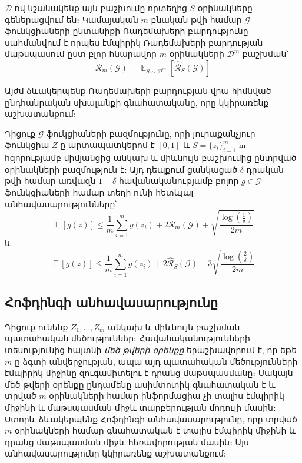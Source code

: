 \documentclass[12pt]{article}
\DeclareMathOperator*{\E}{\mathbb{E}}
\begin{document}
\begin{defination}
$\mathcal{D}$-ով նշանակենք այն բաշխումը որտեղից $S$ օրինակները գեներացվում են։ Կամայական $m$ բնական թվի համար $\mathcal{G}$ ֆունկցիաների ընտանիքի Ռադեմախերի բարդությունը սահմանվում է որպես էմպիրիկ Ռադեմախերի բարդության մաթսպասում ըստ բլոր հնարավոր $m$ օրինակների $\mathcal{D}^m$ բաշխման՝
$$\mathcal{R}_m(\mathcal{G}) = \E_{S \sim \mathcal{D}^m} \left [     \hat{\mathcal{R}}_S(\mathcal{G})  \right] $$
\end{defination}
Այժմ ձևակերպենք Ռադեմախերի բարդության վրա հիմնված ընդհանրական սխալանքի գնահատականը, որը կկիրառենք աշխատանքում։ 
\begin{theorem}
\label{rad_comp_th}
Դիցուք $\mathcal{G}$ ֆուկցիաների բազմությունը, որի յուրաքանչյուր ֆունկցիա  $Z$-ը արտապատկերոմ է $[0, 1]$ և $S = \{z_i\}_{i=1}^m$ m հզորությամբ միմյանցից անկախ և միևնույն բաշխումից ընտրված օրինակների բազմություն է։ Այդ դեպքում ցանկացած $\delta$ դրական թվի համար առվազն $1 - \delta$ հավանականությամբ բոլոր $g \in \mathcal{G}$ ֆունկցիաների համար տեղի ունի հետևյալ անհավասարությունները՝
\begin{equation}
\E[g(z)] \leq \frac{1}{m}\sum_{i=1}^mg(z_i) + 2\mathcal{R}_m(\mathcal{G}) + \sqrt{\frac{\log\left( \frac{1}{\delta} \right)}{2m}}
\end{equation}
և
\begin{equation}
\E[g(z)] \leq \frac{1}{m}\sum_{i=1}^mg(z_i) + 2\hat{\mathcal{R}}_S(\mathcal{G}) + 3\sqrt{\frac{\log \left( \frac{2}{\delta} \right)}{2m}}
\end{equation}
\end{theorem}

{}


\subsection*{\hfill Հոֆդինգի անհավասարությունը \hfill} \noindent

 Դիցուք ունենք $Z_1, ..., Z_m$ անկախ և միևնույն բաշխման պատահական մեծություններ։ Հավանականությունների տեսությունից հայտնի \textit{մեծ թվերի օրենքը} երաշխավորում է, որ եթե $m$-ը ձգտի անվերջության, ապա
 այդ պատահական մեծությունների էմպիրիկ միջինը զուգամիտելու է դրանց մաթսպասմանը։ Սակայն մեծ թվերի օրենքը ընդամենը ասիմտոտիկ գնահատական է և տրված $m$ օրինակների համար ինֆորմացիա չի տալիս էմպիրիկ միջինի և մաթսպասման միջև տարբերության մոդուլի մասին։ Ստորև ձևակերպենք Հոֆդինգի անհավասարությունը, որը տրված $m$ օրինակների համար գնահատական է տալիս էմպիրիկ միջինի և դրանց մաթսպասման  միջև հեռավորության մասին։ Այս անհավասարությունը կկիրառենք աշխատանքում։ 
\end{document}
